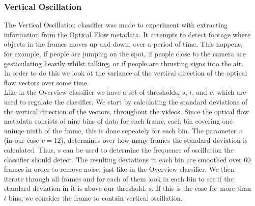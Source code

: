 \subsubsection{Vertical Oscillation}
%
%
The Vertical Oscillation classifier was made to experiment with extracting information from the Optical Flow metadata. It attempts to detect footage where objects in the frames moves up and down, over a period of time. This happens, for example, if people are jumping on the spot, if people close to the camera are gesticulating heavily whilst talking, or if people are thrusting signs into the air. In order to do this we look at the variance of the vertical direction of the optical flow vectors over some time.\\
Like in the Overview classifier we have a set of thresholds, $s$, $t$, and $v$, which are used to regulate the classifier. We start by calculating the standard deviations of the vertical direction of the vectors, throughout the videos. Since the optical flow metadata consists of nine bins of data for each frame, each bin covering one uniuqe ninth of the frame, this is done sepeately for each bin. The parameter $v$ (in our case $v = 12$), determines over how many frames the standard deviation is calculated. Thus, $s$ can be used to determine the frequence of oscillation the classifier should detect. The resulting deviations in each bin are smoothed over 60 frames in order to remove noise, just like in the Overview classifier.
%
%
We then iterate through all frames and for each of them look in each bin to see if the standard deviation in it is above our threshold, $s$. If this is the case for more than $t$ bins, we consider the frame to contain vertical oscillation.
%
%
